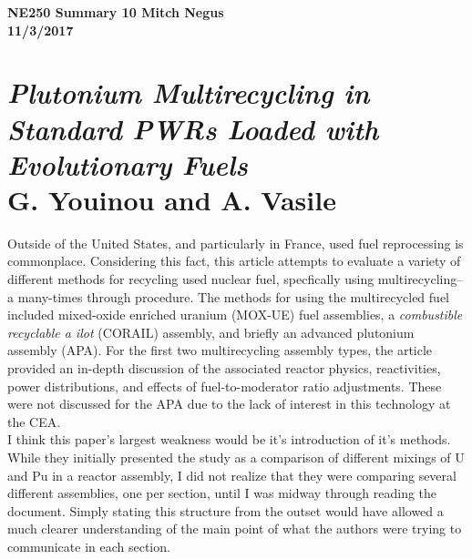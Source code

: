 \documentclass{report}
\newcommand{\tab}{\-\hspace{1cm}}
\begin{document}
\thispagestyle{empty}

{\bf {\large {NE250 Summary {10} \hfill Mitch Negus\\
		\hspace*{\fill} 11/3/2017\\ }}}
\section*{\textsl{Plutonium Multirecycling in Standard PWRs Loaded with Evolutionary Fuels} \\ \normalsize G. Youinou and A. Vasile}

\tab Outside of the United States, and particularly in France, used fuel reprocessing is commonplace. Considering this fact, this article attempts to evaluate a variety of different methods for recycling used nuclear fuel, specfically using multirecycling--a many-times through procedure. The methods for using the multirecycled fuel included mixed-oxide enriched uranium (MOX-UE) fuel assemblies, a \textit{combustible recyclable a ilot} (CORAIL) assembly, and briefly an advanced plutonium assembly (APA). For the first two multirecycling assembly types, the article provided an in-depth discussion of the associated reactor physics, reactivities, power distributions, and effects of fuel-to-moderator ratio adjustments. These were not discussed for the APA due to the lack of interest in this technology at the CEA.  \\
\tab I think this paper's largest weakness would be it's introduction of it's methods. While they initially presented the study as a comparison of different mixings of U and Pu in a reactor assembly, I did not realize that they were comparing several different assemblies, one per section, until I was midway through reading the document. Simply stating this structure from the outset would have allowed a much clearer understanding of the main point of what the authors were trying to communicate in each section. 
\end{document}
